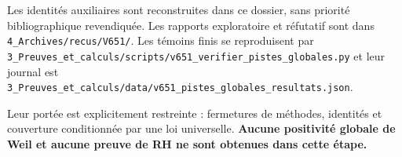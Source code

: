 \documentclass[
  10pt,
  a4paper,
]{article}
\begin{document}
Les identités auxiliaires sont reconstruites dans ce dossier, sans
priorité bibliographique revendiquée. Les rapports exploratoire et
réfutatif sont dans \texttt{4\_Archives/recus/V651/}. Les témoins finis
se reproduisent par
\texttt{3\_Preuves\_et\_calculs/scripts/v651\_verifier\_pistes\_globales.py}
et leur journal est
\texttt{3\_Preuves\_et\_calculs/data/v651\_pistes\_globales\_resultats.json}.

Leur portée est explicitement restreinte : fermetures de méthodes,
identités et couverture conditionnée par une loi universelle.
\textbf{Aucune positivité globale de Weil et aucune preuve de RH ne sont
obtenues dans cette étape.}
\end{document}

